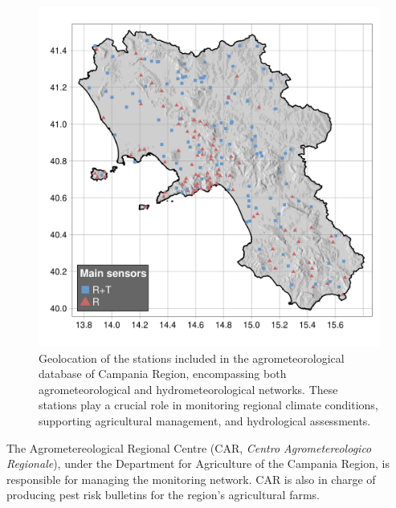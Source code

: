\documentclass[authoryear,preprint,review,12pt]{elsarticle}
\begin{document}
\begin{figure}
	\centering
    \includegraphics[scale=0.6]{Fig07_map_stations.png}
	\caption{ Geolocation of the stations included in the agrometeorological database of Campania Region, %
    encompassing both agrometeorological and hydrometeorological networks. These stations play a crucial role in monitoring regional climate conditions, supporting agricultural management, and hydrological assessments.
    }
	\label{fig:rarLocations}
\end{figure}

The Agrometereological Regional Centre (CAR, \emph{Centro Agrometereologico Regionale}), under the Department for Agriculture of the Campania Region, is responsible for managing the monitoring network.
CAR is also in charge of producing pest risk bulletins for the region's agricultural farms.
\end{document}
